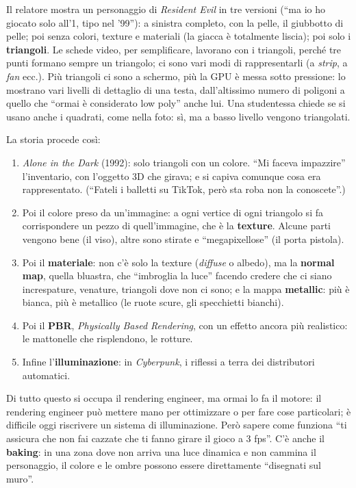 Il relatore mostra un personaggio di \emph{Resident Evil} in tre versioni
(``ma io ho giocato solo all'1, tipo nel '99''): a sinistra completo, con la
pelle, il giubbotto di pelle; poi senza colori, texture e materiali (la giacca
è totalmente liscia); poi solo i \textbf{triangoli}. Le schede video, per
semplificare, lavorano con i triangoli, perché tre punti formano sempre un
triangolo; ci sono vari modi di rappresentarli (a \emph{strip}, a \emph{fan}
ecc.). Più triangoli ci sono a schermo, più la GPU è messa sotto pressione:
lo mostrano vari livelli di dettaglio di una testa, dall'altissimo numero di
poligoni a quello che ``ormai è considerato low poly'' anche lui. Una
studentessa chiede se si usano anche i quadrati, come nella foto: sì, ma a
basso livello vengono triangolati.

La storia procede così:
\begin{enumerate}
  \item \emph{Alone in the Dark} (1992): solo triangoli con un colore. ``Mi
        faceva impazzire'' l'inventario, con l'oggetto 3D che girava; e si
        capiva comunque cosa era rappresentato. (``Fateli i balletti su TikTok,
        però sta roba non la conoscete''.)
  \item Poi il colore preso da un'immagine: a ogni vertice di ogni triangolo
        si fa corrispondere un pezzo di quell'immagine, che è la
        \textbf{texture}. Alcune parti
        vengono bene (il viso), altre sono stirate e ``megapixellose'' (il
        porta pistola).
  \item Poi il \textbf{materiale}: non c'è solo la texture (\emph{diffuse} o
        albedo), ma la \textbf{normal map}, quella bluastra, che ``imbroglia la
        luce'' facendo credere che ci siano increspature, venature, triangoli
        dove non ci sono; e la mappa \textbf{metallic}: più è bianca, più è
        metallico (le ruote scure, gli specchietti bianchi).
  \item Poi il \textbf{PBR}, \emph{Physically Based Rendering}, con un effetto
        ancora più realistico: le mattonelle che risplendono, le rotture.
  \item Infine l'\textbf{illuminazione}: in \emph{Cyberpunk}, i riflessi a
        terra dei distributori automatici.
\end{enumerate}
Di tutto questo si occupa il rendering engineer, ma ormai lo fa il motore: il
rendering engineer può mettere mano per ottimizzare o per fare cose
particolari; è difficile oggi riscrivere un sistema di illuminazione. Però
sapere come funziona ``ti assicura che non fai cazzate che ti fanno girare il
gioco a 3 fps''. C'è anche il \textbf{baking}: in una zona dove non arriva una
luce dinamica e non cammina il personaggio, il colore e le ombre possono
essere direttamente ``disegnati sul muro''.

